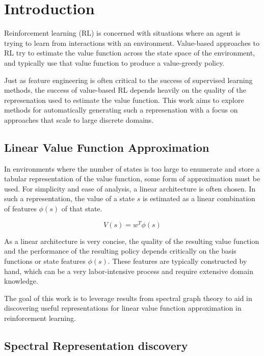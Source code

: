 \section{Introduction}

Reinforcement learning (RL) is concerned with situations where an agent is
trying to learn from interactions with an environment. Value-based approaches 
to RL try to estimate the value function across the state space of the 
environment, and typically use that value function to produce a value-greedy
policy.

Just as feature engineering is often critical to the success of supervised 
learning methods, the success of value-based RL depends heavily on the quality
of the represenation used to estimate the value function. This work aims to 
explore methods for automatically generating such a represenation with a focus 
on approaches that scale to large discrete domains.

\subsection{Linear Value Function Approximation}

In environments where the number of states is too large to enumerate and store 
a tabular representation of the value function, some form of approximation must
be used. For simplicity and ease of analysis, a linear architecture is often 
chosen. In such a representation, the value of a state $s$ is estimated as a 
linear combination of features $\phi(s)$ of that state.

\begin{equation}
V(s) = w^{T}\phi(s)
\end{equation}

As a linear architecture is very concise, the quality of the resulting value
function and the performance of the resulting policy depends critically on the 
basis functions or state features $\phi(s)$. These features are typically 
constructed by hand, which can be a very labor-intensive process and require
extensive domain knowledge. 

The goal of this work is to leverage results from spectral graph theory to aid 
in discovering useful representations for linear value function approximation
in reinforcement learning. 

\subsection{Spectral Representation discovery}

